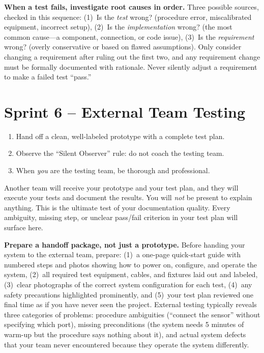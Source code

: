 \documentclass[11pt,letterpaper]{article}
\begin{document}
\begin{tipbox}
\textbf{When a test fails, investigate root causes in order.} Three possible sources, checked in this sequence: (1)~Is the \textit{test} wrong? (procedure error, miscalibrated equipment, incorrect setup), (2)~Is the \textit{implementation} wrong? (the most common cause---a component, connection, or code issue), (3)~Is the \textit{requirement} wrong? (overly conservative or based on flawed assumptions). Only consider changing a requirement after ruling out the first two, and any requirement change must be formally documented with rationale. Never silently adjust a requirement to make a failed test ``pass.''
\end{tipbox}

\section{Sprint 6 -- External Team Testing}

\begin{priorities}
\begin{enumerate}[leftmargin=*, itemsep=1pt, topsep=0pt]
    \item Hand off a clean, well-labeled prototype with a complete test plan.
    \item Observe the ``Silent Observer'' rule: do not coach the testing team.
    \item When \textit{you} are the testing team, be thorough and professional.
\end{enumerate}
\end{priorities}

\begin{faqbox}
Another team will receive your prototype and your test plan, and they will execute your tests and document the results. You will \textit{not} be present to explain anything. This is the ultimate test of your documentation quality. Every ambiguity, missing step, or unclear pass/fail criterion in your test plan will surface here.
\end{faqbox}

\begin{tipbox}
\textbf{Prepare a handoff package, not just a prototype.} Before handing your system to the external team, prepare: (1)~a one-page quick-start guide with numbered steps and photos showing how to power on, configure, and operate the system, (2)~all required test equipment, cables, and fixtures laid out and labeled, (3)~clear photographs of the correct system configuration for each test, (4)~any safety precautions highlighted prominently, and (5)~your test plan reviewed one final time as if you have never seen the project. External testing typically reveals three categories of problems: procedure ambiguities (``connect the sensor'' without specifying which port), missing preconditions (the system needs 5 minutes of warm-up but the procedure says nothing about it), and actual system defects that your team never encountered because they operate the system differently.
\end{tipbox}
\end{document}
